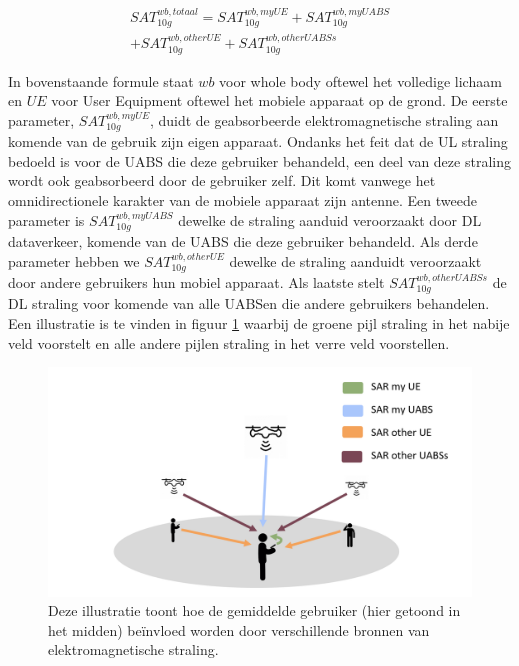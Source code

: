 \documentclass[twocolumn]{phdsymp_dutch}
\begin{document}
\begin{equation} 
\begin{aligned}
SAT^{wb,totaal}_{10g} = SAT^{wb,myUE}_{10g} +  SAT^{wb,myUABS}_{10g} \\
+ SAT^{wb,otherUE}_{10g} + SAT^{wb,otherUABSs}_{10g}
\end{aligned}
\label{eq:overallSARwb}
\end{equation}

In bovenstaande formule staat $wb$ voor whole body oftewel het volledige lichaam en $UE$ voor User Equipment oftewel het mobiele apparaat op de grond.
De eerste parameter, $SAT^{wb,myUE}_{10g}$, duidt de geabsorbeerde elektromagnetische straling aan komende van de gebruik zijn eigen apparaat.
Ondanks het feit dat de \gls{UL} straling bedoeld is voor de \gls{UABS} die deze gebruiker behandeld,
een deel van deze straling wordt ook geabsorbeerd door de gebruiker zelf. 
Dit komt vanwege het omnidirectionele karakter van de mobiele apparaat zijn antenne.
Een tweede parameter is $SAT^{wb,myUABS}_{10g}$ dewelke de straling aanduid veroorzaakt door \gls{DL} dataverkeer, komende van de \gls{UABS} die deze gebruiker behandeld.
Als derde parameter hebben we $SAT^{wb,otherUE}_{10g}$ dewelke de straling aanduidt veroorzaakt door andere gebruikers hun mobiel apparaat.
Als laatste stelt $SAT^{wb,otherUABSs}_{10g}$ de \gls{DL} straling voor komende van alle \gls{UABS}en die andere gebruikers behandelen.
Een illustratie is te vinden in figuur \ref{fig:networkIllustration} waarbij de groene pijl straling in het nabije veld voorstelt en alle andere 
pijlen straling in het verre veld voorstellen.

\begin{figure}[h!]
\centering
  \includegraphics[width=\linewidth]{networkIllustrationSARSources.png}
  \caption{Deze illustratie toont hoe de gemiddelde gebruiker (hier getoond in het midden) be\"invloed worden door verschillende bronnen van elektromagnetische straling.}
  \label{fig:networkIllustration}
\end{figure}
\end{document}
